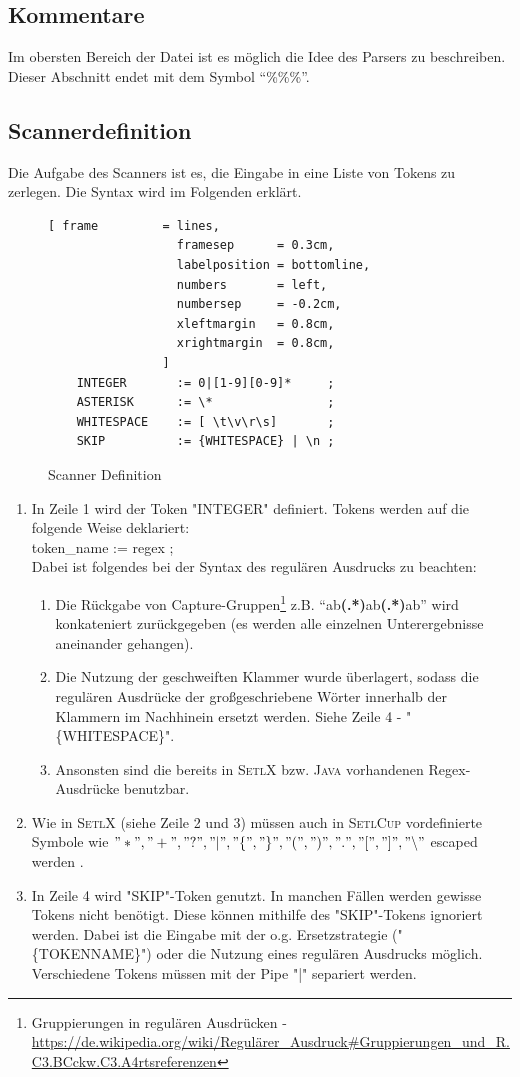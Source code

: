 \subsection{Kommentare}
Im obersten Bereich der Datei ist es möglich die Idee des Parsers zu beschreiben.
Dieser Abschnitt endet mit dem Symbol "`\%\%\%"'. 
\subsection{Scannerdefinition}
Die Aufgabe des Scanners ist es, die Eingabe in eine Liste von Tokens zu zerlegen. Die Syntax wird im Folgenden erklärt.
\begin{figure}[!ht]
\begin{Verbatim}[ frame         = lines, 
                  framesep      = 0.3cm, 
                  labelposition = bottomline,
                  numbers       = left,
                  numbersep     = -0.2cm,
                  xleftmargin   = 0.8cm,
                  xrightmargin  = 0.8cm,
                ]
	INTEGER       := 0|[1-9][0-9]*     ;
	ASTERISK      := \*                ;
	WHITESPACE    := [ \t\v\r\s]       ;
	SKIP          := {WHITESPACE} | \n ;
\end{Verbatim}
\caption{Scanner Definition}
\label{fig:scanner_def}
\end{figure}
\begin{enumerate}
	\item In Zeile 1 wird der Token "INTEGER" definiert. Tokens werden auf die folgende Weise deklariert:\\
					token\_name := regex ; \\
					Dabei ist folgendes bei der Syntax des regulären Ausdrucks zu beachten:
					\begin{enumerate}
						\item Die Rückgabe von Capture-Gruppen\footnote{Gruppierungen in regulären Ausdrücken -  \url{https://de.wikipedia.org/wiki/Regulärer_Ausdruck\#Gruppierungen_und_R.C3.BCckw.C3.A4rtsreferenzen}} z.B. "`ab\textbf{(.*)}ab\textbf{(.*)}ab"'	wird konkateniert zurückgegeben (es werden alle einzelnen Unterergebnisse aneinander gehangen).
						\item Die Nutzung der geschweiften Klammer wurde überlagert, sodass die regulären Ausdrücke der großgeschriebene Wörter innerhalb der Klammern im Nachhinein ersetzt werden. Siehe Zeile 4 - "\{WHITESPACE\}".
						\item Ansonsten sind die bereits in \textsc{SetlX} bzw. \textsc{Java} vorhandenen Regex-Ausdrücke benutzbar.
					\end{enumerate}
	\item Wie in \textsc{SetlX} (siehe Zeile 2 und 3) müssen auch in \textsc{SetlCup} vordefinierte Symbole wie $"*","+","?","|","\{","\}","(",")",".","[","]","\backslash"$ escaped werden .
	\item In Zeile 4 wird "SKIP"-Token genutzt. In manchen Fällen werden gewisse Tokens nicht benötigt. Diese können mithilfe des "SKIP"-Tokens ignoriert werden. Dabei ist die Eingabe mit der o.g. Ersetzstrategie ("\{TOKENNAME\}") oder die Nutzung eines regulären Ausdrucks möglich. Verschiedene Tokens müssen mit der Pipe "|" separiert werden.
\end{enumerate}

